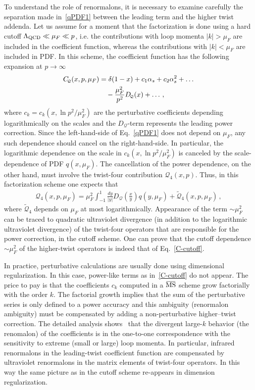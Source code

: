 \documentclass[aps,prd,twocolumn,a4paper,superscriptaddress,10pt,showpacs,notitlepage,floatfix]{revtex4-1}
\newcommand{\overbar}[1]{\mkern 1.5mu\overline{\mkern-1.5mu#1\mkern-1.5mu}\mkern 1.5mu}
\newcommand{\MSbar}{\overbar{\text{MS}}}
\newcommand{\Qd}{\!\scriptscriptstyle \mathcal{Q}}
\begin{document}
To understand the role of renormalons, it is necessary to examine carefully the separation made in~\eqref{qPDF1} between the leading term and the higher twist addenda. Let us assume for a moment that the factorization is done using a hard cutoff $\Lambda_{\rm QCD} \ll \mu_F  \ll p$, i.e. the contributions with loop momenta $|k| > \mu_F$ are included  in the coefficient function, whereas the contributions with $|k| < \mu_F$ are included in PDF. In this scheme, 
the coefficient function has the following expansion at $p\to\infty$
\begin{align}
\label{C-cutoff}
 C_{\Qd}(x,p,\mu_F) &= \delta(1-x) + c_1 \alpha_s + c_2\alpha_s^2 + \ldots 
\notag\\ &\quad{}
- \frac{\mu_F^2}{p^2} D_{\Qd}(x) +\ldots\,,
\end{align}    
where $c_k= c_k(x,\ln p^2/\mu_F^2)$ are the perturbative coefficients depending logarithmically on the scales and the $D_{\Qd}$-term represents the leading power correction. Since the left-hand-side of Eq.~\eqref{qPDF1} does not depend on $\mu_F$, any such dependence should cancel on the right-hand-side. In particular, the logarithmic dependence on the scale in $c_k(x,\ln p^2/\mu_F^2)$ is canceled by the scale-dependence of PDF $q(x,\mu_F)$. The cancellation of the power dependence, on the other hand, must involve the twist-four contribution $\mathcal{Q}_4(x,p)$. Thus, in this factorization scheme one expects that
\begin{align}
\label{Q4-cutoff}
 \mathcal{Q}_4(x,p,\mu_F) = \mu_F^2 \int_{-1}^1 \!\frac{dy}{|y|} D_{\Qd}(\tfrac{x}{y}) q(y,\mu_F) + \widetilde{\mathcal{Q}}_4(x,p,\mu_F)\,,  
\end{align} 
where $\widetilde{\mathcal{Q}}_4$ depends on $\mu_F$ at most logarithmically. 
Appearance of the term $\sim \mu_F^2$ can be traced to quadratic ultraviolet divergence (in addition to the logarithmic ultraviolet divergence) 
of the twist-four operators that are responsible for the power correction, in the cutoff scheme. 
One can prove that the cutoff dependence $\sim \mu_F^2$ of the higher-twist operators is indeed that of Eq.~\eqref{C-cutoff}.    

In practice, perturbative calculations are usually done using dimensional regularization. In this case, power-like terms as in~\eqref{C-cutoff} do not appear. The price to pay is that the coefficients $c_k$ computed in a $\MSbar$ scheme grow factorially with the order $k$. The factorial growth implies that the sum of the perturbative series is only defined to a power accuracy and this ambiguity (renormalon ambiguity) must be compensated by adding a non-perturbative higher--twist correction. The detailed analysis shows~\cite{Beneke:1998ui,Beneke:2000kc} that the divergent large-$k$ behavior (the renomalon) of the coefficients is in the one-to-one correspondence with the sensitivity to extreme (small or large) loop momenta. In particular, infrared renormalons in  the leading-twist coefficient function are compensated by ultraviolet renormalons in the matrix elements of twist-four operators. In this way the same picture as in the cutoff scheme re-appears in dimension regularization.
\end{document}

